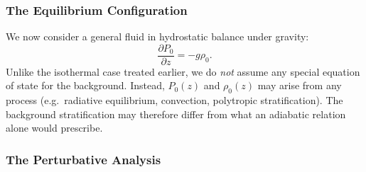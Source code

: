 \subsubsection*{The Equilibrium Configuration}

We now consider a general fluid in hydrostatic balance under gravity:
\[
\frac{\partial P_0}{\partial z} = - g \rho_0.
\]
Unlike the isothermal case treated earlier, we do \emph{not} assume any special equation of state for the background. Instead, $P_0(z)$ and $\rho_0(z)$ may arise from any process (e.g.\ radiative equilibrium, convection, polytropic stratification). The background stratification may therefore differ from what an adiabatic relation alone would prescribe.

\subsubsection*{The Perturbative Analysis}

